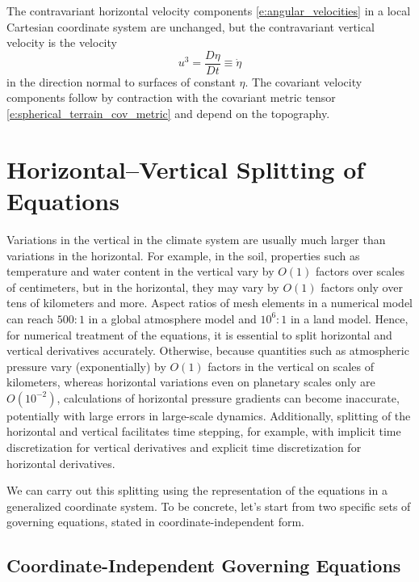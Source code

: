 \documentclass{report}
\begin{document}
The contravariant horizontal velocity components \eqref{e:angular_velocities} in a local Cartesian coordinate system are unchanged, but the contravariant vertical velocity is the velocity
\[
u^3 = \frac{D\eta}{Dt} \equiv \dot\eta
\]
in the direction normal to surfaces of constant $\eta$. The covariant velocity components follow by contraction with the covariant metric tensor \eqref{e:spherical_terrain_cov_metric} and depend on the topography.


\section{Horizontal--Vertical Splitting of Equations}

Variations in the vertical in the climate system are usually much larger than variations in the horizontal. For example, in the soil, properties such as temperature and water content  in the vertical vary by $O(1)$ factors over scales of centimeters, but in the horizontal, they may vary by $O(1)$ factors only over tens of kilometers and more. Aspect ratios of mesh elements in a numerical model can reach $500:1$ in a global atmosphere model and $10^6:1$ in a land model. Hence, for numerical treatment of the equations, it is essential to split horizontal and vertical derivatives accurately. Otherwise, because quantities such as atmospheric pressure vary (exponentially) by $O(1)$ factors in the vertical on scales of kilometers, whereas horizontal variations even on planetary scales only are $O(10^{-2})$, calculations of horizontal pressure gradients can become inaccurate, potentially with large errors in large-scale dynamics. Additionally, splitting of the horizontal and vertical facilitates time stepping, for example, with implicit time discretization for vertical derivatives and explicit time discretization for horizontal derivatives. 

We can carry out this splitting using the representation of the equations in a generalized coordinate system. To be concrete, let's start from two specific sets of governing equations, stated in coordinate-independent form. 

\subsection{Coordinate-Independent Governing Equations}
\end{document}
